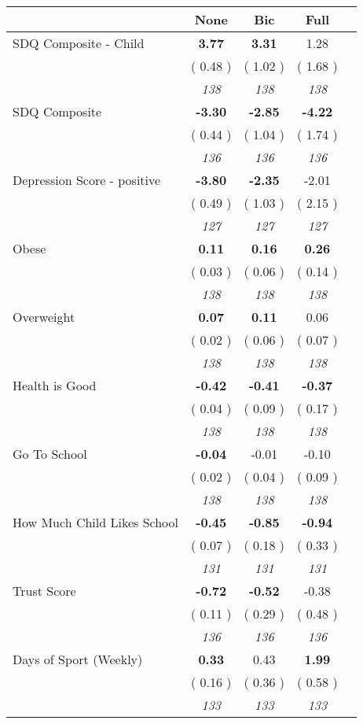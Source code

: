 \begin{tabular}{l c c c c}
\toprule
 & None & Bic & Full \\
\midrule
SDQ Composite - Child & \textbf{      3.77 } & \textbf{      3.31 } &      1.28 \\
& (     0.48 ) & (     1.02 ) & (     1.68 ) \\
& \textit{ 138 } & \textit{ 138 } & \textit{ 138 } \\
SDQ Composite & \textbf{     -3.30 } & \textbf{     -2.85 } & \textbf{     -4.22 } \\
& (     0.44 ) & (     1.04 ) & (     1.74 ) \\
& \textit{ 136 } & \textit{ 136 } & \textit{ 136 } \\
Depression Score - positive & \textbf{     -3.80 } & \textbf{     -2.35 } &     -2.01 \\
& (     0.49 ) & (     1.03 ) & (     2.15 ) \\
& \textit{ 127 } & \textit{ 127 } & \textit{ 127 } \\
Obese & \textbf{      0.11 } & \textbf{      0.16 } & \textbf{      0.26 } \\
& (     0.03 ) & (     0.06 ) & (     0.14 ) \\
& \textit{ 138 } & \textit{ 138 } & \textit{ 138 } \\
Overweight & \textbf{      0.07 } & \textbf{      0.11 } &      0.06 \\
& (     0.02 ) & (     0.06 ) & (     0.07 ) \\
& \textit{ 138 } & \textit{ 138 } & \textit{ 138 } \\
Health is Good & \textbf{     -0.42 } & \textbf{     -0.41 } & \textbf{     -0.37 } \\
& (     0.04 ) & (     0.09 ) & (     0.17 ) \\
& \textit{ 138 } & \textit{ 138 } & \textit{ 138 } \\
Go To School & \textbf{     -0.04 } &     -0.01 &     -0.10 \\
& (     0.02 ) & (     0.04 ) & (     0.09 ) \\
& \textit{ 138 } & \textit{ 138 } & \textit{ 138 } \\
How Much Child Likes School & \textbf{     -0.45 } & \textbf{     -0.85 } & \textbf{     -0.94 } \\
& (     0.07 ) & (     0.18 ) & (     0.33 ) \\
& \textit{ 131 } & \textit{ 131 } & \textit{ 131 } \\
Trust Score & \textbf{     -0.72 } & \textbf{     -0.52 } &     -0.38 \\
& (     0.11 ) & (     0.29 ) & (     0.48 ) \\
& \textit{ 136 } & \textit{ 136 } & \textit{ 136 } \\
Days of Sport (Weekly) & \textbf{      0.33 } &      0.43 & \textbf{      1.99 } \\
& (     0.16 ) & (     0.36 ) & (     0.58 ) \\
& \textit{ 133 } & \textit{ 133 } & \textit{ 133 } \\
\bottomrule
\end{tabular}
